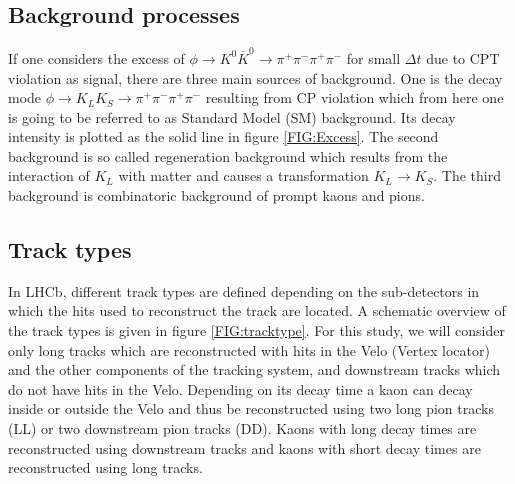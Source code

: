 \subsection{Background processes}

If one considers the excess of $\phi \rightarrow K^0 \overline{K}^0 \rightarrow \pi^+ \pi^- \pi^+ \pi^-$ for small $\Delta t$ due to CPT violation as signal, there are three main sources of background. One is the decay mode $\phi \rightarrow K_L K_S \rightarrow \pi^+\pi^-\pi^+\pi^-$ resulting from CP violation which from here one is going to be referred to as Standard Model (SM) background. Its decay intensity is plotted as the solid line in figure \ref{FIG:Excess}. The second background is so called regeneration background which results from the interaction of $K_L$ with matter and causes a transformation $K_L \rightarrow K_S$. The third background is combinatoric background of prompt kaons and pions.

\subsection{Track types}

In LHCb, different track types are defined depending on the sub-detectors in which the hits used to reconstruct the track are located. A schematic overview of the track types is given in figure \ref{FIG:tracktype}. For this study, we will consider only long tracks which are reconstructed with hits in the Velo (Vertex locator) and the other components of the tracking system, and downstream tracks which do not have hits in the Velo. Depending on its decay time a kaon can decay inside or outside the Velo and thus be reconstructed using two long pion tracks (LL) or two downstream pion tracks (DD). Kaons with long decay times are reconstructed using downstream tracks and kaons with short decay times are reconstructed using long tracks.


\begin{center}
    \def\svgwidth{.9\textwidth}
    
\label{FIG:tracktype}
\end{center}
